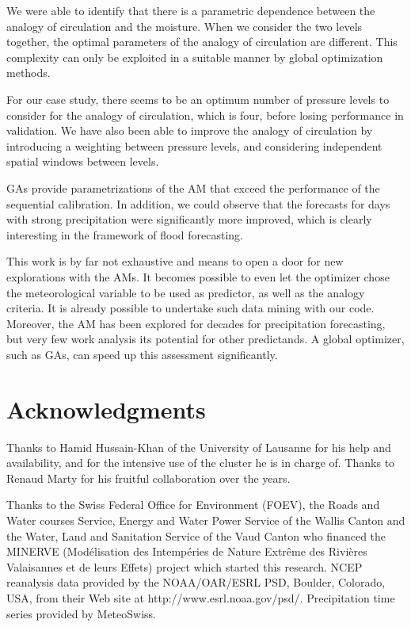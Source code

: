 \documentclass[5p]{elsarticle}
\begin{document}
We were able to identify that there is a parametric dependence between the analogy of circulation and the moisture. When we consider the two levels together, the optimal parameters of the analogy of circulation are different. This complexity can only be exploited in a suitable manner by global optimization methods.

For our case study, there seems to be an optimum number of pressure levels to consider for the analogy of circulation, which is four, before losing performance in validation. We have also been able to improve the analogy of circulation by introducing a weighting between pressure levels, and considering independent spatial windows between levels.

GAs provide parametrizations of the AM that exceed the performance of the sequential calibration. In addition, we could observe that the forecasts for days with strong precipitation were significantly more improved, which is clearly interesting in the framework of flood forecasting.

This work is by far not exhaustive and means to open a door for new explorations with the AMs. It becomes possible to even let the optimizer chose the meteorological variable to be used as predictor, as well as the analogy criteria. It is already possible to undertake such data mining with our code. Moreover, the AM has been explored for decades for precipitation forecasting, but very few work analysis its potential for other predictands. A global optimizer, such as GAs, can speed up this assessment significantly.


\section*{Acknowledgments}
Thanks to Hamid Hussain-Khan of the University of Lausanne for his help and availability, and for the intensive use of the cluster he is in charge of. Thanks to Renaud Marty for his fruitful collaboration over the years.

Thanks to the Swiss Federal Office for Environment (FOEV), the Roads and Water courses Service, Energy and Water Power Service of the Wallis Canton and the Water, Land and Sanitation Service of the Vaud Canton who financed the MINERVE (Mod\'{e}lisation des Intemp\'{e}ries de Nature Extr\^{e}me des Rivi\`{e}res Valaisannes et de leurs Effets) project which started this research. NCEP reanalysis data provided by the NOAA/OAR/ESRL PSD, Boulder, Colorado, USA, from their Web site at http://www.esrl.noaa.gov/psd/. Precipitation time series provided by MeteoSwiss. 
\end{document}
